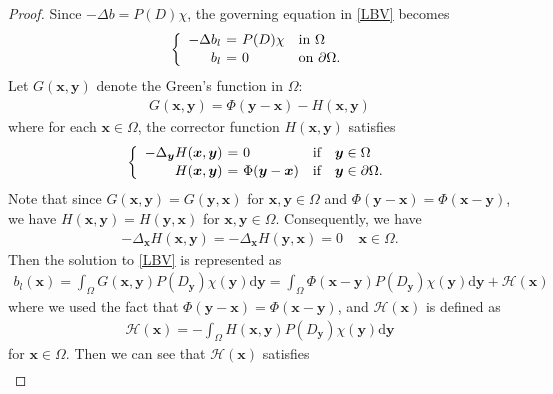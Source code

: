\documentclass[reqno]{siamonline1116}
\numberwithin{theorem}{section}
\numberwithin{equation}{section}
\def\rd{\mathrm{d}}
\def\Om{\Omega}
\def\p{\partial}
\def\x{\boldsymbol{x}}
\def\y{{\boldsymbol y}}
\def\mH{{\mathcal H}}
\begin{document}
\begin{proof} Since $-\Delta b=P(D)\chi$, the governing equation in \cref{LBV} becomes
\begin{align*}
\left\{\begin{array}{rcll}
-\Delta b_l\hspace{-0.65em}&=\hspace{-0.65em}&P(D)\chi&\text{in}~\Om \vspace{0.125em}\\
b_l\hspace{-0.65em}&=\hspace{-0.65em}&0&\text{on}~\p\Om.
\end{array}\right.
\end{align*}
Let $G(\x,\y)$ denote the Green's function in $\Om$:
\begin{align*}
G(\x,\y)=\Phi(\y-\x)-H(\x,\y)
\end{align*}
where for each $\x\in\Om$, the corrector function $H(\x,\y)$ satisfies
\begin{align*}
\left\{\begin{array}{rclll}
-\Delta_{\y} H(\x,\y)\hspace{-0.65em}&=\hspace{-0.65em}&0&\text{if}&\y\in\Om \vspace{0.125em}\\
H(\x,\y)\hspace{-0.65em}&=\hspace{-0.65em}&\Phi(\y-\x)&\text{if}&\y\in\p\Om.
\end{array}\right.
\end{align*}
Note that since $G(\x,\y)=G(\y,\x)$ for $\x,\y\in\Om$ and $\Phi(\y-\x)=\Phi(\x-\y)$, we have $H(\x,\y)=H(\y,\x)$ for $\x,\y\in\Om$. Consequently, we have
\begin{align}\label{CorrectorHarmonicSym}
-\Delta_{\x}H(\x,\y)=-\Delta_{\x}H(\y,\x)=0~~~~~\x\in\Om.
\end{align}
Then the solution to \cref{LBV} is represented as
\begin{align*}
b_l(\x)=\int_{\Om}G(\x,\y)P(D_{\y})\chi(\y)\rd\y=\int_{\Om}\Phi(\x-\y)P(D_{\y})\chi(\y)\rd\y+\mH(\x)
\end{align*}
where we used the fact that $\Phi(\y-\x)=\Phi(\x-\y)$, and $\mH(\x)$ is defined as
\begin{align*}\label{HarmonicInterior}
\mH(\x)=-\int_{\Om}H(\x,\y)P(D_{\y})\chi(\y)\rd\y
\end{align*}
for $\x\in\Om$. Then we can see that $\mH(\x)$ satisfies
\begin{align}\label{H_HarmonicEq}

\end{align}
\end{proof}
\end{document}
